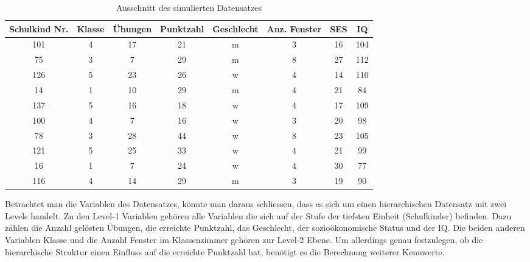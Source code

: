 \documentclass[12pt]{article}\usepackage[]{graphicx}\usepackage[]{color}
\numberwithin{equation}{section}
\begin{document}
\begin{table}[ht]
\centering
\caption{Ausschnitt des simulierten Datensatzes} 
\vspace{5mm}
\begin{tabular}{cccccccc}
  \toprule
 Schulkind Nr. & Klasse & Übungen & Punktzahl & Geschlecht & Anz. Fenster & SES & IQ \\ 
  \midrule
101 & 4 & 17 & 21 & m & 3 & 16 & 104 \\ 
  75 & 3 & 7 & 29 & m & 8 & 27 & 112 \\ 
  126 & 5 & 23 & 26 & w & 4 & 14 & 110 \\ 
  14 & 1 & 10 & 29 & m & 4 & 21 & 84 \\ 
  137 & 5 & 16 & 18 & w & 4 & 17 & 109 \\ 
  100 & 4 & 7 & 16 & w & 3 & 20 & 98 \\ 
  78 & 3 & 28 & 44 & w & 8 & 23 & 105 \\ 
  121 & 5 & 25 & 33 & w & 4 & 21 & 99 \\ 
  16 & 1 & 7 & 24 & w & 4 & 30 & 77 \\ 
  116 & 4 & 14 & 29 & m & 3 & 19 & 90 \\ 
   \bottomrule
\end{tabular}
\label{tab:beispiel_theorie}
\end{table}

Betrachtet man die Variablen des Datensatzes, könnte man daraus schliessen, dass es sich um einen hierarchischen Datensatz mit zwei Levels handelt. Zu den Level-1 Variablen gehören alle Variablen die sich auf der Stufe der tiefsten Einheit (Schulkinder) befinden. Dazu zählen die Anzahl gelösten Übungen, die erreichte Punktzahl, das Geschlecht, der sozioökonomische Status und der IQ. Die beiden anderen Variablen Klasse und die Anzahl Fenster im Klassenzimmer gehören zur Level-2 Ebene. Um allerdings genau festzulegen, ob die hierarchische Struktur einen Einfluss auf die erreichte Punktzahl hat, benötigt es die Berechnung weiterer Kennwerte. 
\end{document}
